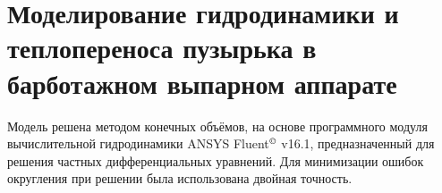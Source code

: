 \section{Моделирование гидродинамики и теплопереноса пузырька в барботажном выпарном аппарате}


Модель решена методом конечных объёмов, на основе программного модуля вычислительной гидродинамики ANSYS Fluent\(^\copyright\)
v16.1, предназначенный для решения частных дифференциальных уравнений. 
Для минимизации ошибок округления при решении была использована двойная точность.









